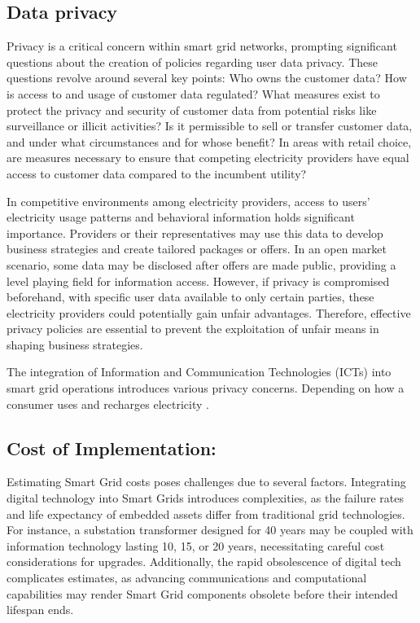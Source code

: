 \subsection{Data privacy}
Privacy is a critical concern within smart grid networks, prompting significant questions about the creation of policies regarding user data privacy. These questions revolve around several key points: Who owns the customer data? How is access to and usage of customer data regulated? What measures exist to protect the privacy and security of customer data from potential risks like surveillance or illicit activities? Is it permissible to sell or transfer customer data, and under what circumstances and for whose benefit? In areas with retail choice, are measures necessary to ensure that competing electricity providers have equal access to customer data compared to the incumbent utility?

In competitive environments among electricity providers, access to users' electricity usage patterns and behavioral information holds significant importance. Providers or their representatives may use this data to develop business strategies and create tailored packages or offers. In an open market scenario, some data may be disclosed after offers are made public, providing a level playing field for information access. However, if privacy is compromised beforehand, with specific user data available to only certain parties, these electricity providers could potentially gain unfair advantages. Therefore, effective privacy policies are essential to prevent the exploitation of unfair means in shaping business strategies.

The integration of Information and Communication Technologies (ICTs) into smart grid operations introduces various privacy concerns. Depending on how a consumer uses and recharges electricity \cite{zeadally2013towards}.

\subsection{Cost of Implementation:}

Estimating Smart Grid costs poses challenges due to several factors. Integrating digital technology into Smart Grids introduces complexities, as the failure rates and life expectancy of embedded assets differ from traditional grid technologies. For instance, a substation transformer designed for 40 years may be coupled with information technology lasting 10, 15, or 20 years, necessitating careful cost considerations for upgrades. Additionally, the rapid obsolescence of digital tech complicates estimates, as advancing communications and computational capabilities may render Smart Grid components obsolete before their intended lifespan ends. 

